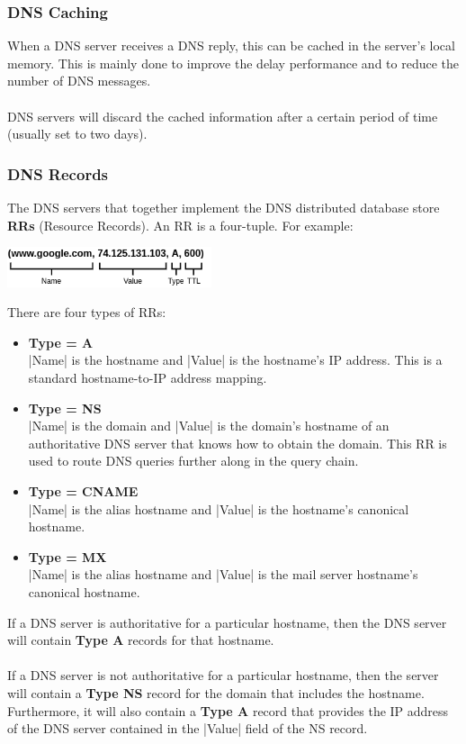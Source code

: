 \documentclass{article}
\begin{document}
\subsubsection{DNS Caching}
When a DNS server receives a DNS reply, this can be cached in the server's local memory. This is mainly done to improve the delay performance and to reduce the number of DNS messages. \\ \\
DNS servers will discard the cached information after a certain period of time (usually set to two days).

\subsubsection{DNS Records}
The DNS servers that together implement the DNS distributed database store \textbf{RRs} (Resource Records). An RR is a four-tuple. For example: \\

\centerline{\includegraphics[width=6cm]{./assets/dns.png}}
\vspace{.6cm}
There are four types of RRs:

\begin{itemize}
	\item \textbf{Type = A}
	\vspace{.2cm} \\
	\cverb|Name| is the hostname and \cverb|Value| is the hostname's IP address. This is a standard hostname-to-IP address mapping.
	\item \textbf{Type = NS}
	\vspace{.2cm} \\
	\cverb|Name| is the domain and \cverb|Value| is the domain's hostname of an authoritative DNS server that knows how to obtain the domain. This RR is used to route DNS queries further along in the query chain.
	\item \textbf{Type = CNAME}
	\vspace{.2cm} \\
	\cverb|Name| is the alias hostname and \cverb|Value| is the hostname's canonical hostname.
	\item \textbf{Type = MX}
	\vspace{.2cm} \\
	\cverb|Name| is the alias hostname and \cverb|Value| is the mail server hostname's canonical hostname.
\end{itemize}
If a DNS server is authoritative for a particular hostname, then the DNS server will contain \textbf{Type A} records for that hostname. \\ \\
If a DNS server is not authoritative for a particular hostname, then the server will contain a \textbf{Type NS} record for the domain that includes the hostname. Furthermore, it will also contain a \textbf{Type A} record that provides the IP address of the DNS server contained in the \cverb|Value| field of the NS record.
\end{document}

